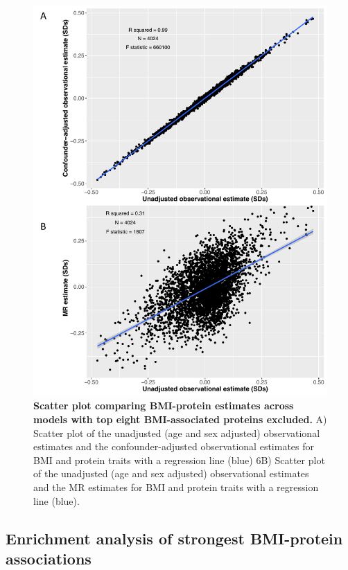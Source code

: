 \documentclass[11pt,twoside]{bristolthesis}
\begin{document}
\begin{figure}

{\centering \includegraphics[width=0.8\linewidth]{figure/BMI_protein_INTERVAL/Obs_MR_scatter_without_top8} 

}

\caption[Scatter plot comparing BMI-protein estimates across models with top eight BMI-associated proteins excluded]{\textbf{Scatter plot comparing BMI-protein estimates across models with top eight BMI-associated proteins excluded.} A) Scatter plot of the unadjusted (age and sex adjusted) observational estimates and the confounder-adjusted observational estimates for BMI and protein traits with a regression line (blue) 6B) Scatter plot of the unadjusted (age and sex adjusted) observational estimates and the MR estimates for BMI and protein traits with a regression line (blue).}\label{fig:Obs-MR-without-top8}
\end{figure}
\hypertarget{enrichment-analysis-of-strongest-bmi-protein-associations}{%
\subsection{Enrichment analysis of strongest BMI-protein associations}\label{enrichment-analysis-of-strongest-bmi-protein-associations}}
\end{document}
